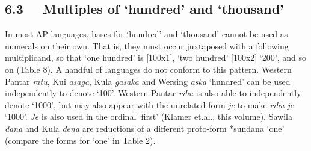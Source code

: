 \subsection[6.3 \ \ Multiples of {\textquoteleft}hundred{\textquoteright} and {\textquoteleft}thousand{\textquoteright} ]{6.3 \ \ Multiples of {\textquoteleft}hundred{\textquoteright} and {\textquoteleft}thousand{\textquoteright} }
In most AP languages, bases for {\textquoteleft}hundred{\textquoteright} and {\textquoteleft}thousand{\textquoteright} cannot be used as numerals on their own. That is, they must occur juxtaposed with a following multiplicand, so that {\textquoteleft}one hundred{\textquoteright} is [100x1], {\textquoteleft}two hundred{\textquoteright} [100x2] {\textquoteleft}200{\textquoteright}, and so on (Table 8). A handful of languages do not conform to this pattern. Western Pantar \textit{ratu}, Kui \textit{asaga}, Kula \textit{gasaka }and Wersing \textit{aska} {\textquoteleft}hundred{\textquoteright} can be used independently to denote {\textquoteleft}100{\textquoteright}. Western Pantar \textit{ribu} is also able to independently denote {\textquoteleft}1000{\textquoteright}, but may also appear with the unrelated form \textit{je} to make \textit{ribu je} {\textquoteleft}1000{\textquoteright}. \textit{Je }is also used in the ordinal {\textquoteleft}first{\textquoteright} (Klamer et.al., this volume). Sawila \textit{
dana} and Kula \textit{dena} are reductions of a different proto-form *sundana {\textquoteleft}one{\textquoteright} (compare the forms for {\textquoteleft}one{\textquoteright} in Table 2).


